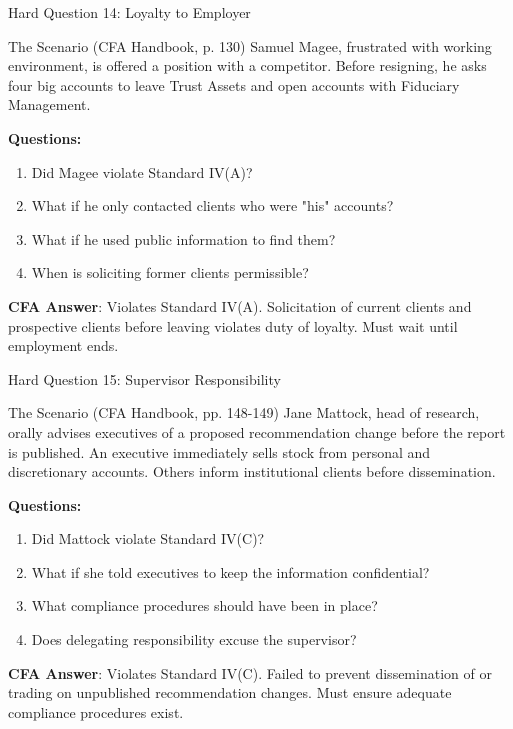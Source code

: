 \documentclass{beamer}
\begin{document}
	\begin{frame}{Hard Question 14: Loyalty to Employer}
		\begin{block}{The Scenario (CFA Handbook, p. 130)}
			Samuel Magee, frustrated with working environment, is offered a position with a competitor. Before resigning, he asks four big accounts to leave Trust Assets and open accounts with Fiduciary Management.
		\end{block}
		
		\vspace{0.2cm}
		\textbf{Questions:}
		\begin{enumerate}
			\item Did Magee violate Standard IV(A)?
			\item What if he only contacted clients who were "his" accounts?
			\item What if he used public information to find them?
			\item When is soliciting former clients permissible?
		\end{enumerate}
		
		\vspace{0.2cm}
		\textcolor{cfablue}{\textbf{CFA Answer}}: Violates Standard IV(A). Solicitation of current clients and prospective clients before leaving violates duty of loyalty. Must wait until employment ends.
	\end{frame}
	
	\begin{frame}{Hard Question 15: Supervisor Responsibility}
		\begin{block}{The Scenario (CFA Handbook, pp. 148-149)}
			Jane Mattock, head of research, orally advises executives of a proposed recommendation change before the report is published. An executive immediately sells stock from personal and discretionary accounts. Others inform institutional clients before dissemination.
		\end{block}
		
		\vspace{0.2cm}
		\textbf{Questions:}
		\begin{enumerate}
			\item Did Mattock violate Standard IV(C)?
			\item What if she told executives to keep the information confidential?
			\item What compliance procedures should have been in place?
			\item Does delegating responsibility excuse the supervisor?
		\end{enumerate}
		
		\vspace{0.2cm}
		\textcolor{cfablue}{\textbf{CFA Answer}}: Violates Standard IV(C). Failed to prevent dissemination of or trading on unpublished recommendation changes. Must ensure adequate compliance procedures exist.
	\end{frame}
	
\end{document}
